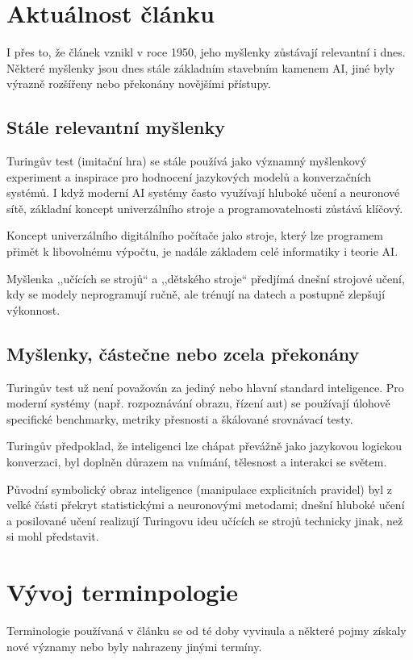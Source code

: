 \documentclass[a4paper,oneside,11pt,usenames,dvipsnames]{article}
\begin{document}
\section{Aktuálnost článku}
\label{sec:aktualnost}
I přes to, že článek vznikl v roce 1950, jeho myšlenky zůstávají relevantní i dnes. Některé myšlenky jsou dnes stále základním stavebním kamenem AI, jiné byly výrazně rozšířeny nebo překonány novějšími přístupy.

\subsection{Stále relevantní myšlenky}
\label{subsec:stale-relevantni}
Turingův test (imitační hra) se stále používá jako významný myšlenkový experiment a inspirace pro hodnocení jazykových modelů a konverzačních systémů. I když moderní AI systémy často využívají hluboké učení a neuronové sítě, základní koncept univerzálního stroje a programovatelnosti zůstává klíčový.

Koncept univerzálního digitálního počítače jako stroje, který lze programem přimět k libovolnému výpočtu, je nadále základem celé informatiky i teorie AI.

Myšlenka ,,učících se strojů`` a ,,dětského stroje`` předjímá dnešní strojové učení, kdy se modely neprogramují ručně, ale trénují na datech a postupně zlepšují výkonnost.

\subsection{Myšlenky, částečne nebo zcela překonány}
\label{subsec:prekonane-myslenky}
Turingův test už není považován za jediný nebo hlavní standard inteligence. Pro moderní systémy (např. rozpoznávání obrazu, řízení aut) se používají úlohově specifické benchmarky, metriky přesnosti a škálované srovnávací testy.

Turingův předpoklad, že inteligenci lze chápat převážně jako jazykovou logickou konverzaci, byl doplněn důrazem na vnímání, tělesnost a interakci se světem.

Původní symbolický obraz inteligence (manipulace explicitních pravidel) byl z velké části překryt statistickými a neuronovými metodami; dnešní hluboké učení a posilované učení realizují Turingovu ideu učících se strojů technicky jinak, než si mohl představit.

\section{Vývoj terminpologie}
\label{sec:vývoj-terminologie}
Terminologie používaná v článku se od té doby vyvinula a některé pojmy získaly nové významy nebo byly nahrazeny jinými termíny.
\end{document}

